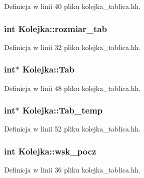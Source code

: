 \-Definicja w linii 40 pliku kolejka\-\_\-tablica.\-hh.

\hypertarget{class_kolejka_a72ba80c6ad16d9e2f5a8a02ec257524b}{
\subsubsection[{rozmiar\-\_\-tab}]{\setlength{\rightskip}{0pt plus 5cm}int {\bf \-Kolejka\-::rozmiar\-\_\-tab}}}\label{class_kolejka_a72ba80c6ad16d9e2f5a8a02ec257524b}


\-Definicja w linii 32 pliku kolejka\-\_\-tablica.\-hh.

\hypertarget{class_kolejka_adfbcda2500bf9d82a22d8d717ee6f695}{
\subsubsection[{\-Tab}]{\setlength{\rightskip}{0pt plus 5cm}int$\ast$ {\bf \-Kolejka\-::\-Tab}}}\label{class_kolejka_adfbcda2500bf9d82a22d8d717ee6f695}


\-Definicja w linii 48 pliku kolejka\-\_\-tablica.\-hh.

\hypertarget{class_kolejka_a5ec5307ce26f31ae9c29f91bd7527225}{
\subsubsection[{\-Tab\-\_\-temp}]{\setlength{\rightskip}{0pt plus 5cm}int$\ast$ {\bf \-Kolejka\-::\-Tab\-\_\-temp}}}\label{class_kolejka_a5ec5307ce26f31ae9c29f91bd7527225}


\-Definicja w linii 52 pliku kolejka\-\_\-tablica.\-hh.

\hypertarget{class_kolejka_a9fc9f63fded5c275d32f8b05125e8428}{
\subsubsection[{wsk\-\_\-pocz}]{\setlength{\rightskip}{0pt plus 5cm}int {\bf \-Kolejka\-::wsk\-\_\-pocz}}}\label{class_kolejka_a9fc9f63fded5c275d32f8b05125e8428}


\-Definicja w linii 36 pliku kolejka\-\_\-tablica.\-hh.

